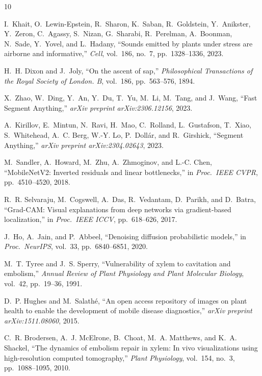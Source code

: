 \documentclass[11pt,a4paper,twocolumn]{article}
\begin{document}
\begin{thebibliography}{10}

I.~Khait, O.~Lewin-Epstein, R.~Sharon, K.~Saban, R.~Goldstein, Y.~Anikster, Y.~Zeron, C.~Agassy, S.~Nizan, G.~Sharabi, R.~Perelman, A.~Boonman, N.~Sade, Y.~Yovel, and L.~Hadany,
``Sounds emitted by plants under stress are airborne and informative,''
\emph{Cell}, vol.~186, no.~7, pp.~1328--1336, 2023.

H.~H. Dixon and J.~Joly,
``On the ascent of sap,''
\emph{Philosophical Transactions of the Royal Society of London. B}, vol.~186, pp.~563--576, 1894.

X.~Zhao, W.~Ding, Y.~An, Y.~Du, T.~Yu, M.~Li, M.~Tang, and J.~Wang,
``Fast Segment Anything,''
\emph{arXiv preprint arXiv:2306.12156}, 2023.

A.~Kirillov, E.~Mintun, N.~Ravi, H.~Mao, C.~Rolland, L.~Gustafson, T.~Xiao, S.~Whitehead, A.~C. Berg, W.-Y. Lo, P.~Doll{\'a}r, and R.~Girshick,
``Segment Anything,''
\emph{arXiv preprint arXiv:2304.02643}, 2023.

M.~Sandler, A.~Howard, M.~Zhu, A.~Zhmoginov, and L.-C. Chen,
``MobileNetV2: Inverted residuals and linear bottlenecks,''
in \emph{Proc.\ IEEE CVPR}, pp.~4510--4520, 2018.

R.~R. Selvaraju, M.~Cogswell, A.~Das, R.~Vedantam, D.~Parikh, and D.~Batra,
``Grad-CAM: Visual explanations from deep networks via gradient-based localization,''
in \emph{Proc.\ IEEE ICCV}, pp.~618--626, 2017.

J.~Ho, A.~Jain, and P.~Abbeel,
``Denoising diffusion probabilistic models,''
in \emph{Proc.\ NeurIPS}, vol.~33, pp.~6840--6851, 2020.

M.~T. Tyree and J.~S. Sperry,
``Vulnerability of xylem to cavitation and embolism,''
\emph{Annual Review of Plant Physiology and Plant Molecular Biology}, vol.~42, pp.~19--36, 1991.

D.~P. Hughes and M.~Salath{\'e},
``An open access repository of images on plant health to enable the development of mobile disease diagnostics,''
\emph{arXiv preprint arXiv:1511.08060}, 2015.

C.~R. Brodersen, A.~J. McElrone, B.~Choat, M.~A. Matthews, and K.~A. Shackel,
``The dynamics of embolism repair in xylem: In vivo visualizations using high-resolution computed tomography,''
\emph{Plant Physiology}, vol.~154, no.~3, pp.~1088--1095, 2010.

\end{thebibliography}
\end{document}
